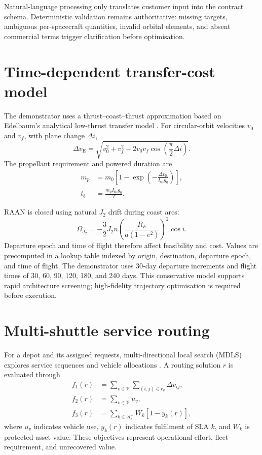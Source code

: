 \documentclass[review,12pt,authoryear]{elsarticle}
\newcommand{\dv}{\Delta v}
\begin{document}
Natural-language processing only translates customer input into the contract
schema. Deterministic validation remains authoritative: missing targets,
ambiguous per-spacecraft quantities, invalid orbital elements, and absent
commercial terms trigger clarification before optimisation.

\section{Time-dependent transfer-cost model}
\label{sec:transfer}

The demonstrator uses a thrust--coast--thrust approximation based on Edelbaum's
analytical low-thrust transfer model \citep{edelbaum1961}. For circular-orbit
velocities $v_0$ and $v_f$, with plane change $\Delta i$,
\begin{equation}
 \dv_{\mathrm{E}}=
 \sqrt{v_0^2+v_f^2-2v_0v_f\cos\left(\frac{\pi}{2}\Delta i\right)}.
\end{equation}
The propellant requirement and powered duration are
\begin{align}
 m_p&=m_0\left[1-\exp\left(-\frac{\dv_{\mathrm{E}}}
 {I_{\mathrm{sp}}g_0}\right)\right],\\
 t_b&=\frac{m_p I_{\mathrm{sp}}g_0}{T}.
\end{align}

RAAN is closed using natural $J_2$ drift during coast arcs:
\begin{equation}
 \dot{\Omega}_{J_2}=-\frac{3}{2}J_2n
 \left(\frac{R_E}{a(1-e^2)}\right)^2\cos i.
\end{equation}
Departure epoch and time of flight therefore affect feasibility and cost.
Values are precomputed in a lookup table indexed by origin, destination,
departure epoch, and time of flight. The demonstrator uses 30-day departure
increments and flight times of 30, 60, 90, 120, 180, and 240 days. This
conservative model supports rapid architecture screening; high-fidelity
trajectory optimisation is required before execution.

\section{Multi-shuttle service routing}
\label{sec:routing}

For a depot and its assigned requests, multi-directional local search (MDLS)
explores service sequences and vehicle allocations \citep{tricoire2012}. A
routing solution $r$ is evaluated through
\begin{align}
 f_1(r)&=\sum_{v\in\mathcal{V}}\sum_{(i,j)\in r_v}\dv_{ij},\\
 f_2(r)&=\sum_{v\in\mathcal{V}}u_v,\\
 f_3(r)&=\sum_{k\in\mathcal{A}_\tau^+}W_k[1-y_k(r)],
\end{align}
where $u_v$ indicates vehicle use, $y_k(r)$ indicates fulfilment of SLA $k$,
and $W_k$ is protected asset value. These objectives represent operational
effort, fleet requirement, and unrecovered value.
\end{document}
